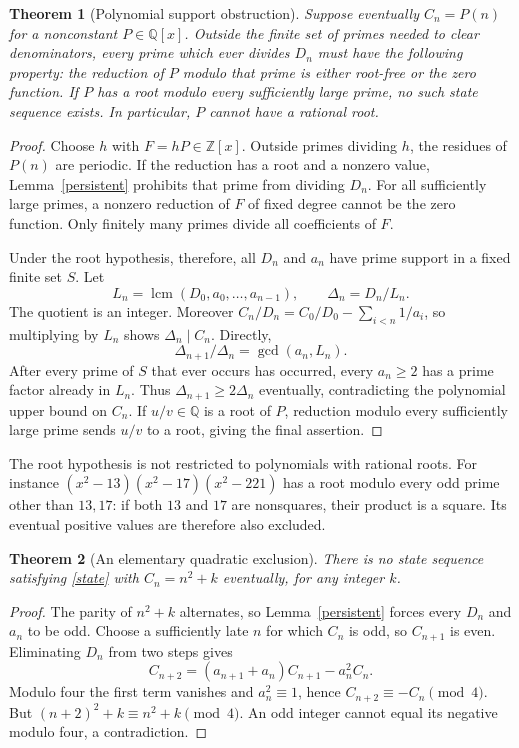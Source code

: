 \documentclass[11pt]{article}
\newtheorem{theorem}{Theorem}
\begin{document}
\begin{theorem}[Polynomial support obstruction]\label{poly}
Suppose eventually $C_n=P(n)$ for a nonconstant $P\in\mathbb Q[x]$.
Outside the finite set of primes needed to clear denominators, every prime
which ever divides $D_n$ must have the following property: the reduction
of $P$ modulo that prime is either root-free or the zero function.
If $P$ has a root modulo every sufficiently large prime, no such state
sequence exists. In particular, $P$ cannot have a rational root.
\end{theorem}
\begin{proof}
Choose $h$ with $F=hP\in\mathbb Z[x]$. Outside primes dividing $h$, the
residues of $P(n)$ are periodic. If the reduction has a root and a nonzero
value, Lemma~\ref{persistent} prohibits that prime from dividing $D_n$.
For all sufficiently large primes, a nonzero reduction of $F$ of fixed
degree cannot be the zero function. Only finitely many primes divide all
coefficients of $F$.

Under the root hypothesis, therefore, all $D_n$ and $a_n$ have prime support
in a fixed finite set $S$. Let
\[
 L_n=\operatorname{lcm}(D_0,a_0,\ldots,a_{n-1}),\qquad
 \Delta_n=D_n/L_n.
\]
The quotient is an integer. Moreover
$C_n/D_n=C_0/D_0-\sum_{i<n}1/a_i$, so multiplying by $L_n$ shows
$\Delta_n\mid C_n$. Directly,
\[
 \Delta_{n+1}/\Delta_n=\gcd(a_n,L_n).
\]
After every prime of $S$ that ever occurs has occurred, every $a_n\ge2$
has a prime factor already in $L_n$. Thus $\Delta_{n+1}\ge2\Delta_n$
eventually, contradicting the polynomial upper bound on $C_n$.
If $u/v\in\mathbb Q$ is a root of $P$, reduction modulo every sufficiently
large prime sends $u/v$ to a root, giving the final assertion.
\end{proof}

The root hypothesis is not restricted to polynomials with rational roots.
For instance $(x^2-13)(x^2-17)(x^2-221)$ has a root modulo every odd prime
other than $13,17$: if both $13$ and $17$ are nonsquares, their product is
a square. Its eventual positive values are therefore also excluded.

\begin{theorem}[An elementary quadratic exclusion]\label{quadratic}
There is no state sequence satisfying \eqref{state} with
$C_n=n^2+k$ eventually, for any integer $k$.
\end{theorem}
\begin{proof}
The parity of $n^2+k$ alternates, so Lemma~\ref{persistent} forces every
$D_n$ and $a_n$ to be odd. Choose a sufficiently late $n$ for which $C_n$
is odd, so $C_{n+1}$ is even. Eliminating $D_n$ from two steps gives
\[
 C_{n+2}=(a_{n+1}+a_n)C_{n+1}-a_n^2 C_n.
\]
Modulo four the first term vanishes and $a_n^2\equiv1$, hence
$C_{n+2}\equiv-C_n\pmod4$. But $(n+2)^2+k\equiv n^2+k\pmod4$.
An odd integer cannot equal its negative modulo four, a contradiction.
\end{proof}
\end{document}
